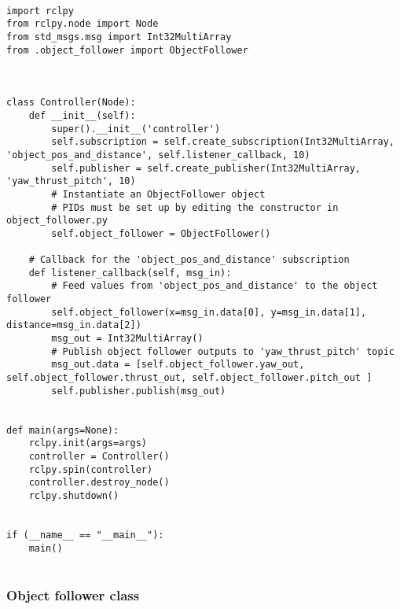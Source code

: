 \begin{lstlisting}[language=PythonPlus, basicstyle=\tiny,]

import rclpy
from rclpy.node import Node
from std_msgs.msg import Int32MultiArray
from .object_follower import ObjectFollower



class Controller(Node):
    def __init__(self):
        super().__init__('controller')
        self.subscription = self.create_subscription(Int32MultiArray, 'object_pos_and_distance', self.listener_callback, 10)
        self.publisher = self.create_publisher(Int32MultiArray, 'yaw_thrust_pitch', 10)
        # Instantiate an ObjectFollower object
        # PIDs must be set up by editing the constructor in object_follower.py
        self.object_follower = ObjectFollower()

    # Callback for the 'object_pos_and_distance' subscription
    def listener_callback(self, msg_in):
        # Feed values from 'object_pos_and_distance' to the object follower
        self.object_follower(x=msg_in.data[0], y=msg_in.data[1], distance=msg_in.data[2])
        msg_out = Int32MultiArray()
        # Publish object follower outputs to 'yaw_thrust_pitch' topic
        msg_out.data = [self.object_follower.yaw_out, self.object_follower.thrust_out, self.object_follower.pitch_out ]
        self.publisher.publish(msg_out)


def main(args=None):
    rclpy.init(args=args)
    controller = Controller()
    rclpy.spin(controller)
    controller.destroy_node()
    rclpy.shutdown()
    

if (__name__ == "__main__"):
    main()


\end{lstlisting}

\subsubsection{Object follower class}

